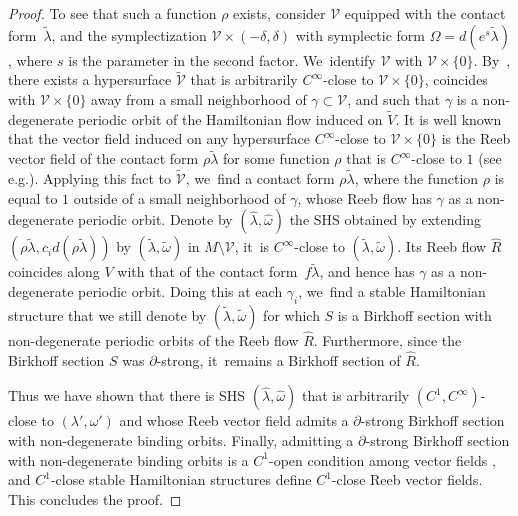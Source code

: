 \documentclass[10pt]{amsart}
\theoremstyle{definition}
\providecommand{\eg}{e.g.}\providecommand{\ie}{i.e.}\providecommand{\etc}{etc.}\providecommand{\resp}{resp.}\providecommand{\cf}{cf.}
\begin{document}
\begin{proof}
To see that such a function $\rho$ exists, consider $\mathcal V$ equipped with the contact form~$\widetilde\lambda$, and the symplectization $\mathcal V\times (-\delta,\delta)$ with symplectic form $\Omega= d(e^s\widetilde\lambda)$, where $s$ is the parameter in the second factor. We~identify $\mathcal V$ with $\mathcal V\times \{0\}$. By~\cite[Lem.\,19]{Ro}, there exists a hypersurface $\widetilde{\mathcal V}$ that is arbitrarily $C^\infty$-close to $\mathcal V\times \{0\}$, coincides with $\mathcal V\times \{0\}$ away from a small neighborhood of $\gamma\subset \mathcal V$, and such that $\gamma$ is a non-degenerate periodic orbit of the Hamiltonian flow induced on $\widetilde V$. It is well known that the vector field induced on any hypersurface $C^\infty$-close to $\mathcal V\times \{0\}$ is the Reeb vector field of the contact form $\rho \widetilde\lambda$ for some function $\rho$ that is $C^\infty$-close to $1$ (see \eg \cite[\S 6]{HWZ2}). Applying this fact to $\widetilde{\mathcal V}$, we~find a contact form $\rho \widetilde \lambda$, where the function $\rho$ is equal to $1$ outside of a small neighborhood of $\gamma$, whose Reeb flow has $\gamma$ as a non-degenerate periodic orbit. Denote by $(\hat \lambda, \hat \omega)$ the SHS obtained by extending $(\rho \widetilde \lambda, c_i d(\rho \widetilde \lambda))$ by $(\widetilde \lambda,\widetilde \omega)$ in $M\setminus \mathcal V$, it~is $C^\infty$-close to $(\widetilde \lambda,\widetilde \omega)$. Its Reeb flow $\hat R$ coincides along $V$ with that of the contact form~$f\widetilde \lambda$, and hence has $\gamma$ as a non-degenerate periodic orbit. Doing this at each $\gamma_i$, we~find a stable Hamiltonian structure that we still denote by $(\widetilde \lambda, \widetilde \omega)$ for which $S$ is a Birkhoff section with non-degenerate periodic orbits of the Reeb flow $\hat R$. Furthermore, since the Birkhoff section $S$ was $\partial$-strong, it~remains a Birkhoff section of $\hat R$.

Thus we have shown that there is SHS $(\hat \lambda,\hat \omega)$ that is arbitrarily $(C^1, C^\infty)$-close to $(\lambda',\omega')$ and whose Reeb vector field admits a $\partial$-strong Birkhoff section with non-degenerate binding orbits. Finally, admitting a $\partial$-strong Birkhoff section with non-degenerate binding orbits is a $C^1$-open condition among vector fields \cite[Prop.\,5.1]{CDHR}, and $C^1$-close stable Hamiltonian structures define $C^1$-close Reeb vector fields. This concludes the proof.
\end{proof}
\end{document}
